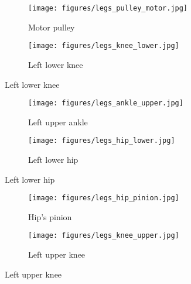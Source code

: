 \begin{figure}[ht!]
    \ContinuedFloat %
    \begin{subfigure}[b]{0.49\textwidth}
        \texttt{[image: figures/legs\_pulley\_motor.jpg]}
        \caption{Motor pulley}
        \label{fig:motor_pulley}
    \end{subfigure}
    \begin{subfigure}[b]{0.49\textwidth}
        \texttt{[image: figures/legs\_knee\_lower.jpg]}
        \caption{Left lower knee}
        \label{fig:lower_knee}
    \end{subfigure}
\end{figure}

\begin{figure}[ht!]
    \ContinuedFloat %
    \begin{subfigure}[b]{0.49\textwidth}
        \texttt{[image: figures/legs\_ankle\_upper.jpg]}
        \caption{Left upper ankle}
        \label{fig:ankle_upper}
    \end{subfigure}
    \begin{subfigure}[b]{0.49\textwidth}
        \texttt{[image: figures/legs\_hip\_lower.jpg]}
        \caption{Left lower hip}
        \label{fig:hip_lower}
    \end{subfigure}
\end{figure}

\begin{figure}[ht!]
    \ContinuedFloat %
    \begin{subfigure}[b]{0.49\textwidth}
        \texttt{[image: figures/legs\_hip\_pinion.jpg]}
        \caption{Hip's pinion}
        \label{fig:hip_pinion}
    \end{subfigure}
    \begin{subfigure}[b]{0.49\textwidth}
        \texttt{[image: figures/legs\_knee\_upper.jpg]}
        \caption{Left upper knee}
        \label{fig:knee_upper}
    \end{subfigure}
\end{figure}

